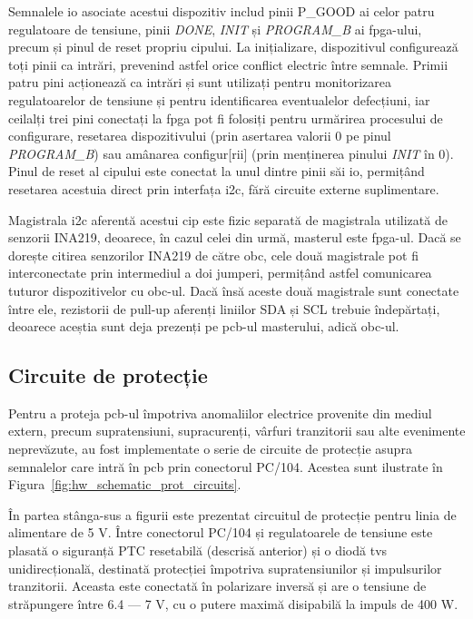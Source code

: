 \documentclass[12pt,a4paper]{report}
\begin{document}
Semnalele \gls{io} asociate acestui dispozitiv includ pinii P\_GOOD ai celor patru regulatoare de tensiune, pinii \textit{DONE}, \textit{INIT} și \textit{PROGRAM\_B} ai \gls{fpga}-ului, precum și pinul de reset propriu cipului. La inițializare, dispozitivul configurează toți pinii ca intrări, prevenind astfel orice conflict electric între semnale. Primii patru pini acționează ca intrări și sunt utilizați pentru monitorizarea regulatoarelor de tensiune și pentru identificarea eventualelor defecțiuni, iar ceilalți trei pini conectați la \gls{fpga} pot fi folosiți pentru urmărirea procesului de configurare, resetarea dispozitivului (prin asertarea valorii 0 pe pinul \textit{PROGRAM\_B}) sau amânarea configur[rii] (prin menținerea pinului \textit{INIT} în 0). Pinul de reset al cipului este conectat la unul dintre pinii săi \gls{io}, permițând resetarea acestuia direct prin interfața \gls{i2c}, fără circuite externe suplimentare.

Magistrala \gls{i2c} aferentă acestui cip este fizic separată de magistrala utilizată de senzorii INA219, deoarece, în cazul celei din urmă, masterul este \gls{fpga}-ul. Dacă se dorește citirea senzorilor INA219 de către \gls{obc}, cele două magistrale pot fi interconectate prin intermediul a doi jumperi, permițând astfel comunicarea tuturor dispozitivelor cu \gls{obc}-ul. Dacă însă aceste două magistrale sunt conectate între ele, rezistorii de pull-up aferenți liniilor SDA și SCL trebuie îndepărtați, deoarece aceștia sunt deja prezenți pe \gls{pcb}-ul masterului, adică \gls{obc}-ul.

\subsection{Circuite de protecție}
Pentru a proteja \gls{pcb}-ul împotriva anomaliilor electrice provenite din mediul extern, precum supratensiuni, supracurenți, vârfuri tranzitorii sau alte evenimente neprevăzute, au fost implementate o serie de circuite de protecție asupra semnalelor care intră în \gls{pcb} prin conectorul PC/104. Acestea sunt ilustrate în Figura~\ref{fig:hw_schematic_prot_circuits}.

În partea stânga-sus a figurii este prezentat circuitul de protecție pentru linia de alimentare de 5 V. Între conectorul PC/104 și regulatoarele de tensiune este plasată o siguranță PTC resetabilă (descrisă anterior) și o diodă \gls{tvs} unidirecțională, destinată protecției împotriva supratensiunilor și impulsurilor tranzitorii. Aceasta este conectată în polarizare inversă și are o tensiune de străpungere între 6.4 --- 7 V, cu o putere maximă disipabilă la impuls de 400 W.
\end{document}
